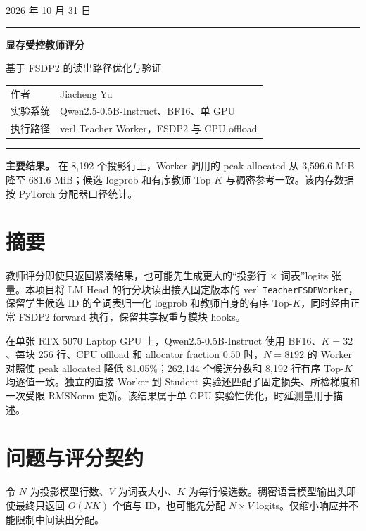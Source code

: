 \documentclass[11pt,a4paper]{article}
\newcommand{\code}[1]{{\small\nolinkurl{#1}}}
\begin{document}
\hypersetup{pageanchor=false}
\begin{titlepage}
\thispagestyle{empty}
\vspace*{9mm}
\hfill{\small 2026 年 10 月 31 日}\par
\vspace{3mm}\hrule height 1pt
\vspace{22mm}
{\fontsize{27}{36}\selectfont\bfseries 显存受控教师评分\par}
\vspace{7mm}
{\large 基于 FSDP2 的读出路径优化与验证\par}
\vspace{17mm}
\begin{tabularx}{\linewidth}{@{}p{34mm}Y@{}}
作者 & Jiacheng Yu\\
实验系统 & Qwen2.5-0.5B-Instruct、BF16、单 GPU\\
执行路径 & verl Teacher Worker，FSDP2 与 CPU offload\\
\end{tabularx}
\vfill
\hrule\vspace{5mm}
{\small\textbf{主要结果。} 在 8,192 个投影行上，Worker 调用的 peak allocated 从 3,596.6 MiB 降至 681.6 MiB；候选 logprob 和有序教师 Top-$K$ 与稠密参考一致。该内存数据按 PyTorch 分配器口径统计。}\par
\vspace{6mm}
\end{titlepage}
\hypersetup{pageanchor=true}

\section*{摘要}
教师评分即使只返回紧凑结果，也可能先生成更大的“投影行 × 词表”logits 张量。本项目将 LM Head 的行分块读出接入固定版本的 verl \code{TeacherFSDPWorker}，保留学生候选 ID 的全词表归一化 logprob 和教师自身的有序 Top-$K$，同时经由正常 FSDP2 forward 执行，保留共享权重与模块 hooks。

在单张 RTX 5070 Laptop GPU 上，Qwen2.5-0.5B-Instruct 使用 BF16、$K=32$、每块 256 行、CPU offload 和 allocator fraction 0.50 时，$N=8192$ 的 Worker 对照使 peak allocated 降低 81.05\%；262,144 个候选分数和 8,192 行有序 Top-$K$ 均逐值一致。独立的直接 Worker 到 Student 实验还匹配了固定损失、所检梯度和一次受限 RMSNorm 更新。该结果属于单 GPU 实验性优化，时延测量用于描述。
\tableofcontents
\clearpage

\section{问题与评分契约}
令 $N$ 为投影模型行数、$V$ 为词表大小、$K$ 为每行候选数。稠密语言模型输出头即使最终只返回 $O(NK)$ 个值与 ID，也可能先分配 $N\times V$ logits。仅缩小响应并不能限制中间读出分配。
\end{document}

